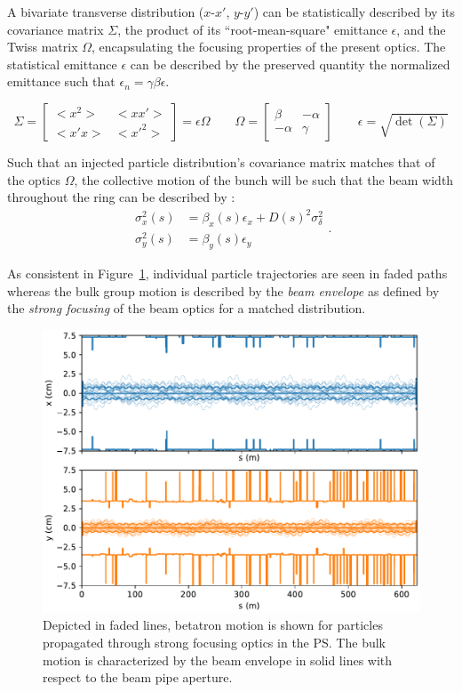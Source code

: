 A bivariate transverse distribution ($x$-$x'$, $y$-$y'$) can be statistically described by its covariance matrix $\Sigma$, the product of its ``root-mean-square" emittance $\epsilon$, and the Twiss matrix $\Omega$, encapsulating the focusing properties of the present optics. The statistical emittance $\epsilon$ can be described by the preserved quantity the normalized emittance such that $\epsilon_n=\gamma\beta\epsilon$.

$$\Sigma = \begin{bmatrix}<x^2> & <xx'> \\ <x'x>& <x'^2>\end{bmatrix} = \epsilon\Omega \qquad \Omega = \begin{bmatrix}\beta &-\alpha \\ -\alpha & \gamma\end{bmatrix} \qquad \epsilon = \sqrt{\det(\Sigma)}$$

Such that an injected particle distribution's covariance matrix matches that of the optics $\Omega$, the collective motion of the bunch will be such that the beam width throughout the ring can be described by :
$$\begin{aligned}
        \sigma^2_x(s) & = \beta_x(s)\epsilon_x+D(s)^2\sigma_\delta^2 \\
        \sigma^2_y(s) & = \beta_y(s)\epsilon_y
    \end{aligned}.$$

As consistent in Figure~\ref{fig:ps_transverse_tracking}, individual particle trajectories are seen in faded paths whereas the bulk group motion is described by the \textit{beam envelope} as defined by the \textit{strong focusing} of the beam optics for a matched distribution.

\begin{figure}
    \centering
    \includegraphics{figs/ps_aperture.multivariate.pdf}
    \caption{Depicted in faded lines, betatron motion is shown for particles propagated through strong focusing optics in the PS. The bulk motion is characterized by the beam envelope in solid lines with respect to the beam pipe aperture.}
    \label{fig:ps_transverse_tracking}
\end{figure}

